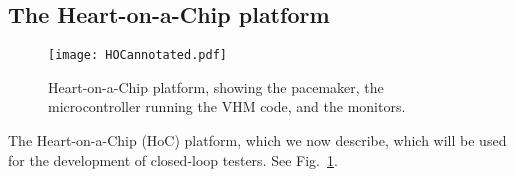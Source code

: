\subsection{The Heart-on-a-Chip platform}
\label{HoC}

\begin{figure}[!t]
	\centering
	\texttt{[image: HOCannotated.pdf]}		
	\caption{\small Heart-on-a-Chip platform, showing the pacemaker, the microcontroller running the VHM code, and the monitors.}
	\label{fig:hoc}
\end{figure} 

The Heart-on-a-Chip (HoC) platform, which we now describe, which will be used for the development of closed-loop testers.
See Fig.~\ref{fig:hoc}.
